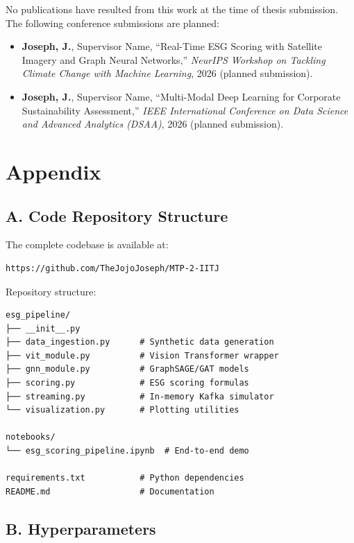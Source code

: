 No publications have resulted from this work at the time of thesis submission. The following conference submissions are planned:

\begin{itemize}
\item \textbf{Joseph, J.}, Supervisor Name, ``Real-Time ESG Scoring with Satellite Imagery and Graph Neural Networks,'' \textit{NeurIPS Workshop on Tackling Climate Change with Machine Learning}, 2026 (planned submission).
\item \textbf{Joseph, J.}, Supervisor Name, ``Multi-Modal Deep Learning for Corporate Sustainability Assessment,'' \textit{IEEE International Conference on Data Science and Advanced Analytics (DSAA)}, 2026 (planned submission).
\end{itemize}

\myemptypage
\section*{Appendix}

\subsection*{A. Code Repository Structure}

The complete codebase is available at:
\begin{verbatim}
https://github.com/TheJojoJoseph/MTP-2-IITJ
\end{verbatim}

Repository structure:
\begin{verbatim}
esg_pipeline/
├── __init__.py
├── data_ingestion.py      # Synthetic data generation
├── vit_module.py          # Vision Transformer wrapper
├── gnn_module.py          # GraphSAGE/GAT models
├── scoring.py             # ESG scoring formulas
├── streaming.py           # In-memory Kafka simulator
└── visualization.py       # Plotting utilities

notebooks/
└── esg_scoring_pipeline.ipynb  # End-to-end demo

requirements.txt           # Python dependencies
README.md                  # Documentation
\end{verbatim}

\subsection*{B. Hyperparameters}

